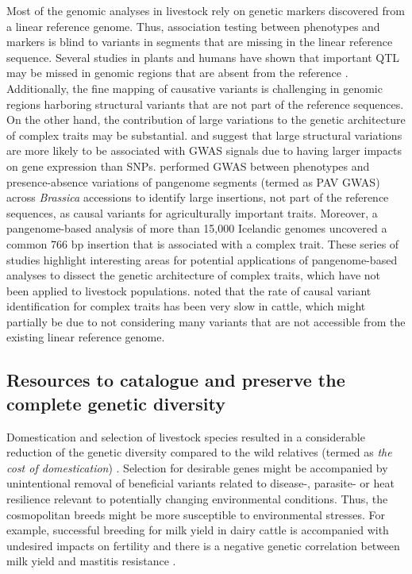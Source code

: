 \documentclass[../main.tex]{subfiles}
\begin{document}
Most of the genomic analyses in livestock rely on genetic markers discovered from a linear reference genome. Thus, association testing between phenotypes and markers is blind to variants in segments that are missing in the linear reference sequence. Several studies in plants and humans have shown that important QTL may be missed in genomic regions that are absent from the reference \citep{kehr2017diversity,gage2019multiple,song2020eight}. Additionally, the fine mapping of causative variants is challenging in genomic regions harboring structural variants that are not part of the reference sequences. On the other hand, the contribution of large variations to the genetic architecture of complex traits may be substantial. \citet{chiang2017impact} and \citet{chaisson2019multi} suggest that large structural variations are more likely to be associated with GWAS signals due to having larger impacts on gene expression than SNPs. \citet{song2020eight} performed GWAS between phenotypes and presence-absence variations of pangenome segments (termed as PAV GWAS) across \emph{Brassica} accessions  to identify large insertions, not part of the reference sequences, as causal variants for agriculturally important traits. Moreover, a pangenome-based analysis of more than 15,000 Icelandic genomes uncovered a common 766 bp insertion \citep{kehr2017diversity} that is associated with a complex trait. These series of studies highlight interesting areas for potential applications of pangenome-based analyses to dissect the genetic architecture of complex traits, which have not been applied to livestock populations. \citet{hayes20191000} noted that the rate of causal variant identification for complex traits has been very slow in cattle, which might partially be due to not considering many variants that are not accessible from the existing linear reference genome. 

\subsection*{Resources to catalogue and preserve the complete genetic diversity}

Domestication and selection of livestock species resulted in a considerable reduction of the genetic diversity compared to the wild relatives (termed as \emph{the cost of domestication}) \citep{mchugo2019unlocking}. Selection for desirable genes might be accompanied by unintentional removal of beneficial variants related to disease-, parasite-  or heat resilience relevant to potentially changing environmental conditions. Thus, the cosmopolitan breeds might be more susceptible to environmental stresses. For example, successful breeding for milk yield in dairy cattle is accompanied with undesired impacts on fertility \citep{pryce2004fertility} and there is a negative genetic correlation between milk yield and mastitis resistance \citep{cai2020distinguishing}. 
\end{document}
